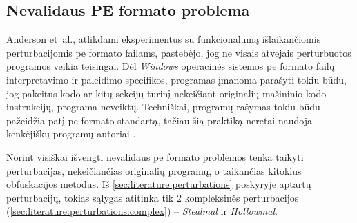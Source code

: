 \subsection{Nevalidaus PE formato problema}\label{sec:literature:pe_invalid}

Anderson et~al., atlikdami eksperimentus su funkcionalumą išlaikančiomis perturbacijomis \acs{pe} formato failams, pastebėjo, jog ne visais atvejais perturbuotos programos veikia teisingai. Dėl \textit{Windows} operacinės sistemos \acs{pe} formato failų interpretavimo ir paleidimo specifikos, programas įmanoma parašyti tokiu būdu, jog pakeitus kodo ar kitų sekcijų turinį nekeičiant originalių mašininio kodo instrukcijų, programa neveiktų. Techniškai, programų rašymas tokiu būdu pažeidžia patį \acs{pe} formato standartą, tačiau šią praktiką neretai naudoja kenkėjiškų programų autoriai \cite{andersonLearningEvadeStatic2018}.

Norint visiškai išvengti nevalidaus \acs{pe} formato problemos tenka taikyti perturbacijas, nekeičiančias originalių programų, o taikančias kitokius obfuskacijos metodus. Iš \ref{sec:literature:perturbations} poskyryje aptartų perturbacijų, tokias sąlygas atitinka tik 2 kompleksinės perturbacijos (\ref{sec:literature:perturbations:complex}) -- \textit{Stealmal} ir \textit{Hollowmal}.
